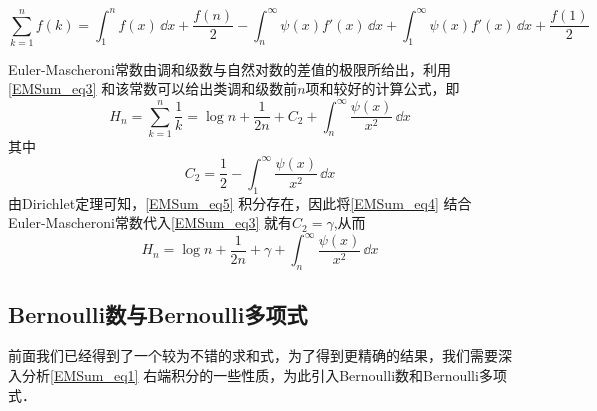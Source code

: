 \begin{equation}\label{EMSum_eq3}
    \sum_{k=1}^{n}f(k)=\int_{1}^{n}f(x)\,\dd x
    +\frac{f(n)}{2}-\int_{n}^{\infty}\psi(x)f'(x)\,\dd x
    +\int_{1}^{\infty}\psi(x)f'(x)\,\dd x+\frac{f(1)}{2}
\end{equation}
\begin{example}{}
Euler-Mascheroni常数由调和级数与自然对数的差值的极限所给出，利用\autoref{EMSum_eq3} 和该常数可以给出类调和级数前$n$项和较好的计算公式，即
\begin{equation}\label{EMSum_eq4}
    H_{n}=\sum_{k=1}^{n}\frac{1}{k}=\log n+\frac{1}{2n}+C_{2}
    +\int_{n}^{\infty}\frac{\psi(x)}{x^2}\,\dd x
\end{equation}
其中
\begin{equation}\label{EMSum_eq5}
    C_{2}=\frac{1}{2}-\int_{1}^{\infty}\frac{\psi(x)}{x^2}\,\dd x
\end{equation}
由Dirichlet定理可知，\autoref{EMSum_eq5} 积分存在，因此将\autoref{EMSum_eq4} 结合
Euler-Mascheroni常数代入\autoref{EMSum_eq3} 就有$C_{2}=\gamma$,从而
\begin{equation}
    H_{n}=\log n+\frac{1}{2n}+\gamma+\int_{n}^{\infty}\frac{\psi(x)}{x^2}\,\dd x
\end{equation}
\end{example}

\subsection{Bernoulli数与Bernoulli多项式}

前面我们已经得到了一个较为不错的求和式，为了得到更精确的结果，我们需要深入分析\autoref{EMSum_eq1} 右端积分的一些性质，为此引入Bernoulli数和Bernoulli多项式．

